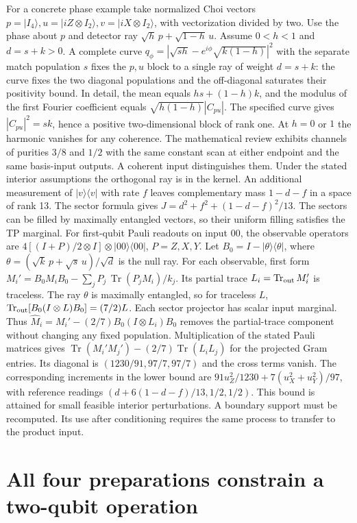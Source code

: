 \documentclass[11pt,letterpaper]{article}
\newcommand{\tr}{\operatorname{Tr}}\newcommand{\TV}{\operatorname{TV}}\newcommand{\E}{\mathbb E}\newcommand{\id}{\mathbb I}\newcommand{\calB}{\mathcal B}\newcommand{\norm}[1]{\left\lVert#1\right\rVert}
\begin{document}
For a concrete phase example take normalized Choi vectors $p=|I_4\rangle,u=|iZ\otimes I_2\rangle,v=|iX\otimes I_2\rangle$, with vectorization divided by two. Use the phase about $p$ and detector ray $\sqrt h\,p+\sqrt{1-h}\,u$. Assume $0<h<1$ and $d=s+k>0$. A complete curve $q_\phi=|\sqrt{sh}-e^{i\phi}\sqrt{k(1-h)}|^2$ with the separate match population $s$ fixes the $p,u$ block to a single ray of weight $d=s+k$: the curve fixes the two diagonal populations and the off-diagonal saturates their positivity bound. In detail, the mean equals $hs+(1-h)k$, and the modulus of the first Fourier coefficient equals $\sqrt{h(1-h)}|C_{pu}|$. The specified curve gives $|C_{pu}|^2=sk$, hence a positive two-dimensional block of rank one. At $h=0$ or $1$ the harmonic vanishes for any coherence. The mathematical review exhibits channels of purities $3/8$ and $1/2$ with the same constant scan at either endpoint and the same basis-input outputs. A coherent input distinguishes them. Under the stated interior assumptions the orthogonal ray is in the kernel. An additional measurement of $|v\rangle\langle v|$ with rate $f$ leaves complementary mass $1-d-f$ in a space of rank 13. The sector formula gives $J=d^2+f^2+(1-d-f)^2/13$. The sectors can be filled by maximally entangled vectors, so their uniform filling satisfies the TP marginal. For first-qubit Pauli readouts on input $00$, the observable operators are $4[(I+P)/2\otimes I]\otimes|00\rangle\langle00|$, $P=Z,X,Y$. Let $B_0=I-|\theta\rangle\langle\theta|$, where $\theta=(\sqrt k\,p+\sqrt s\,u)/\sqrt d$ is the null ray. For each observable, first form $M_i'=B_0 M_i B_0-\sum_j P_j\,\tr(P_jM_i)/k_j$. Its partial trace $L_i=\tr_{\rm out}M_i'$ is traceless. The ray $\theta$ is maximally entangled, so for traceless $L$,
$\tr_{\rm out}[B_0(I\otimes L) B_0]=(7/2)L$. Each sector projector has scalar input marginal. Thus $\widehat M_i=M_i'-(2/7)B_0(I\otimes L_i)B_0$ removes the partial-trace component without changing any fixed population. Multiplication of the stated Pauli matrices gives $\tr(M_i'M_j')-(2/7)\tr(L_iL_j)$ for the projected Gram entries. Its diagonal is $(1230/91,97/7,97/7)$ and the cross terms vanish. The corresponding increments in the lower bound are $91u_Z^2/1230+7(u_X^2+u_Y^2)/97$, with reference readings $(d+6(1-d-f)/13,1/2,1/2)$. This bound is attained for small feasible interior perturbations. A boundary support must be recomputed. Its use after conditioning requires the same process to transfer to the product input.

\section{All four preparations constrain a two-qubit operation}\label{sec:four}
\end{document}
